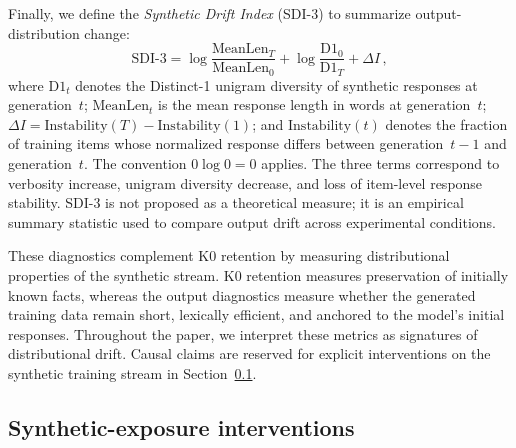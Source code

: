 \documentclass[a4paper,fleqn]{cas-dc}
\newif\ifshowchanges
\newcommand{\rev}[1]{\ifshowchanges{\color{blue}#1}\else{#1}\fi}
\begin{document}
Finally, we define the \textit{Synthetic Drift Index} (SDI-3) to summarize
output-distribution change:
\begin{equation}\label{eq:sdi}
    \mathrm{SDI\text{-}3} =
    \log\frac{\mathrm{MeanLen}_T}{\mathrm{MeanLen}_0}
    + \log\frac{\mathrm{D1}_0}{\mathrm{D1}_T}
    + \Delta I\,,
\end{equation}
where $\mathrm{D1}_t$ denotes the \rev{Distinct-1 unigram diversity} of synthetic
responses at generation~$t$; $\mathrm{MeanLen}_t$ is the mean response length in
words at generation~$t$; $\Delta I = \mathrm{Instability}(T) -
\mathrm{Instability}(1)$; and $\mathrm{Instability}(t)$ denotes the fraction of
training items whose normalized response differs between generation~$t{-}1$ and
generation~$t$. The convention $0\log 0 = 0$ applies. The three terms correspond to verbosity increase, unigram
diversity decrease, and loss of item-level response stability. SDI-3 is not
proposed as a theoretical measure; it is an empirical summary statistic used to
compare output drift across experimental conditions.

These diagnostics complement K0 retention by measuring distributional properties
of the synthetic stream. K0 retention measures preservation of initially known
facts, whereas the output diagnostics measure whether the generated training
data remain short, lexically efficient, and anchored to the model's initial
responses. Throughout the paper, we interpret these metrics as signatures of
distributional drift. Causal claims are reserved for explicit interventions on
the synthetic training stream in Section~\ref{sec:intervention}.

\subsection{Synthetic-exposure interventions}\label{sec:intervention}
\end{document}
